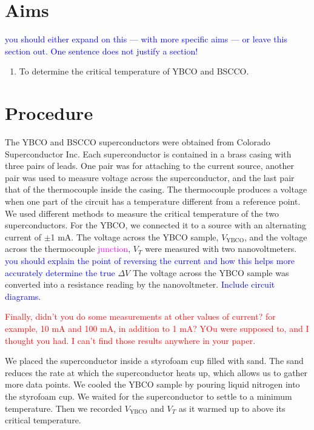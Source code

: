 \documentclass[prb,preprint]{revtex4-1}
\begin{document}
 
\section{Aims}
\textcolor{blue}{you should either expand on this --- with more specific aims --- or leave this section out. One sentence does not justify a section!}
\begin{enumerate}
\item To determine the critical temperature of YBCO and BSCCO.
\end{enumerate}

\section{Procedure}
The YBCO and BSCCO superconductors were obtained from Colorado Superconductor Inc. Each superconductor  is contained in a brass casing with three pairs of leads. 
One pair was for attaching to the current source, another pair was used to measure voltage across the superconductor, and the last pair that of the thermocouple inside the casing. 
The thermocouple produces a voltage when one part of the circuit has a temperature different from a reference point.
We used different methods to measure the critical temperature of the two superconductors.
For the YBCO, we connected it to a source with an alternating current of $\pm$1 mA. 
The voltage across the YBCO sample, $V_{\textrm{YBCO}}$, and the voltage across the thermocouple \textcolor{magenta}{junction}, $V_{T}$ were measured with two nanovoltmeters. \textcolor{blue}{you should explain the point of reversing the current and how this helps more accurately determine the true }$\Delta V$
The voltage across the YBCO sample was converted into a resistance reading by the nanovoltmeter.
 \textcolor{blue}{Include circuit diagrams.} 

\textcolor{red}{Finally, didn't you do some measurements at other values of current? for example, 10 mA and 100 mA, in addition to 1 mA? YOu were supposed to, and I thought you had. I can't find those results anywhere in your paper. } 

We placed the superconductor inside a styrofoam cup filled with sand. 
The sand reduces the rate at which the superconductor heats up, which allows us to gather more data points. 
We cooled the YBCO sample by pouring liquid nitrogen into the styrofoam cup. We waited for the superconductor to settle to a minimum temperature. Then we recorded $V_{\textrm{YBCO}}$ and $V_{T}$ as it warmed up to above its critical temperature. 
\end{document}
